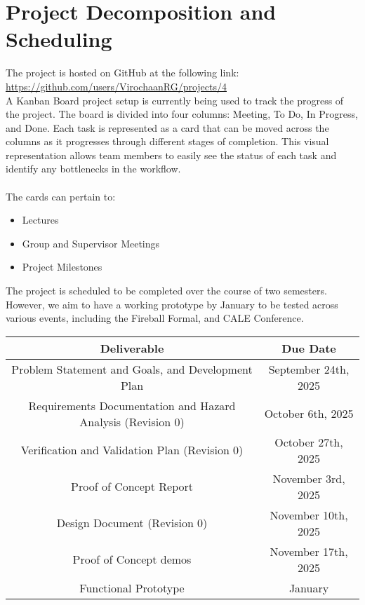 \documentclass{article}
\begin{document}
\section{Project Decomposition and Scheduling}



The project is hosted on GitHub at the following link: \url{https://github.com/users/VirochaanRG/projects/4}
\\
A Kanban Board project setup is currently being used to track the progress of the project. The board is divided into four columns: Meeting, To Do, In Progress, and Done. Each task is represented as a card that can be moved across the columns as it progresses through different stages of completion. This visual representation allows team members to easily see the status of each task and identify any bottlenecks in the workflow.
\\\\
The cards can pertain to:
\begin{itemize}
  \item Lectures
  \item Group and Supervisor Meetings
  \item Project Milestones
\end{itemize}

The project is scheduled to be completed over the course of two semesters. However, we aim to have a working prototype by January to be tested across various events, including the Fireball Formal, and CALE Conference.
\\
\begin{center}
  \begin{tabular}{ |c|c| }
  \hline
  Deliverable & Due Date \\
  \hline
  Problem Statement and Goals, and Development Plan & September 24th, 2025 \\
  Requirements Documentation and Hazard Analysis (Revision 0) & October 6th, 2025  \\
  Verification and Validation Plan (Revision 0) & October 27th, 2025 \\
  Proof of Concept Report & November 3rd, 2025 \\
  Design Document (Revision 0) & November 10th, 2025 \\
  Proof of Concept demos & November 17th, 2025 \\
  Functional Prototype & January \\
  \hline
  \end{tabular}
\end{center}
\end{document}
